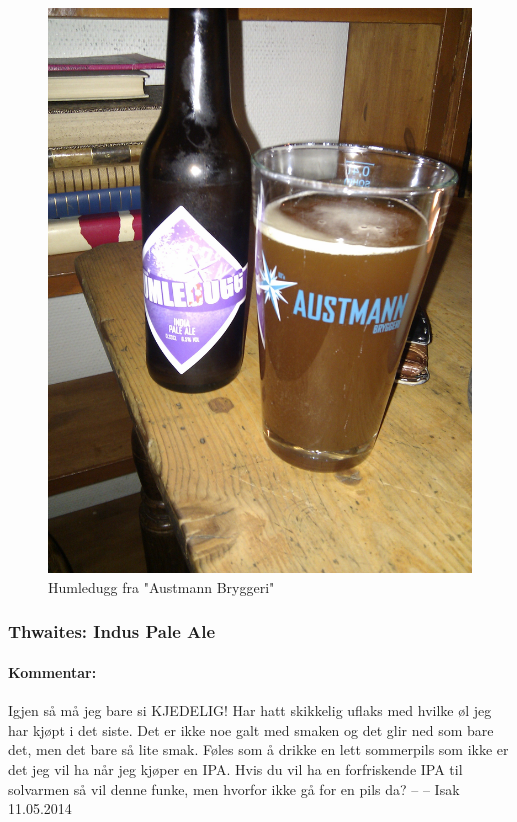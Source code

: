 \documentclass[12pt,a4paper,oneside,norsk]{article}
\begin{document}
\begin{figure} [H]
\centering
\includegraphics[scale=0.1, angle=0]{Bilder/Ol/humledugg.jpg}
\caption{Humledugg fra "Austmann Bryggeri"}
\end{figure}

\newpage
\subsubsection{Thwaites: Indus Pale Ale}
\paragraph{Kommentar:} Igjen så må jeg bare si KJEDELIG! Har hatt skikkelig uflaks med hvilke øl jeg har kjøpt i det siste. Det er ikke noe galt med smaken og det glir ned som bare det, men det bare så lite smak. Føles som å drikke en lett sommerpils som ikke er det jeg vil ha når jeg kjøper en IPA. Hvis du vil ha en forfriskende IPA til solvarmen så vil denne funke, men hvorfor ikke gå for en pils da?
\newline
-- -- Isak 11.05.2014
\end{document}

